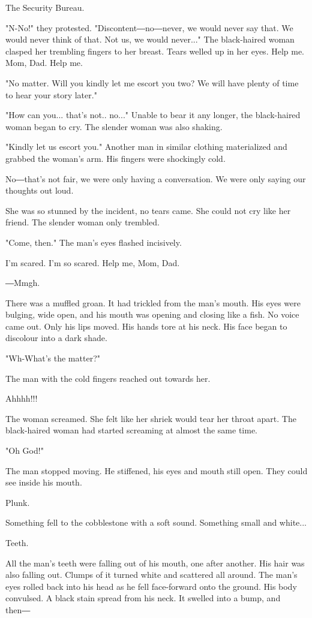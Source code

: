 The Security Bureau.

"N-No!" they protested. "Discontent―no―never, we would never say that.
We would never think of that. Not us, we would never..." The
black-haired woman clasped her trembling fingers to her breast. Tears
welled up in her eyes. Help me. Mom, Dad. Help me.

"No matter. Will you kindly let me escort you two? We will have plenty
of time to hear your story later."

"How can you... that's not.. no..." Unable to bear it any longer, the
black-haired woman began to cry. The slender woman was also shaking.

"Kindly let us escort you." Another man in similar clothing materialized
and grabbed the woman's arm. His fingers were shockingly cold.

No―that's not fair, we were only having a conversation. We were only
saying our thoughts out loud.

She was so stunned by the incident, no tears came. She could not cry
like her friend. The slender woman only trembled.

"Come, then." The man's eyes flashed incisively.

I'm scared. I'm so scared. Help me, Mom, Dad.

―Mmgh.

There was a muffled groan. It had trickled from the man's mouth. His
eyes were bulging, wide open, and his mouth was opening and closing like
a fish. No voice came out. Only his lips moved. His hands tore at his
neck. His face began to discolour into a dark shade.

"Wh-What's the matter?"

The man with the cold fingers reached out towards her.

Ahhhh!!!

The woman screamed. She felt like her shriek would tear her throat
apart. The black-haired woman had started screaming at almost the same
time.

"Oh God!"

The man stopped moving. He stiffened, his eyes and mouth still open.
They could see inside his mouth.

Plunk.

Something fell to the cobblestone with a soft sound. Something small and
white...

Teeth.

All the man's teeth were falling out of his mouth, one after another.
His hair was also falling out. Clumps of it turned white and scattered
all around. The man's eyes rolled back into his head as he fell
face-forward onto the ground. His body convulsed. A black stain spread
from his neck. It swelled into a bump, and then―

